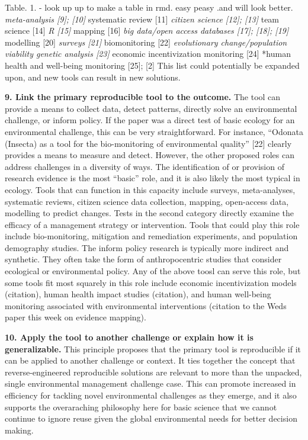 \documentclass[10pt,letterpaper]{article}
\begin{document}
Table. 1. - look up up to make a table in rmd. easy peasy .and will look
better. \emph{meta-analysis {[}9{]}; {[}10{]} }systematic review
{[}11{]} \emph{citizen science {[}12{]}; {[}13{]} }team science {[}14{]}
\emph{R {[}15{]} }mapping {[}16{]} \emph{big data/open access databases
{[}17{]}; {[}18{]}; {[}19{]} }modelling {[}20{]} \emph{surveys {[}21{]}
}biomonitoring {[}22{]} \emph{evolutionary change/population viability
genetic analysis {[}23{]} }economic incentivization monitoring {[}24{]}
*human health and well-being monitoring {[}25{]}; {[}2{]} This list
could potentially be expanded upon, and new tools can result in new
solutions.

\textbf{9. Link the primary reproducible tool to the outcome.} The tool
can provide a means to collect data, detect patterns, directly solve an
environmental challenge, or inform policy. If the paper was a direct
test of basic ecology for an environmental challenge, this can be very
straightforward. For instance, ``Odonata (Insecta) as a tool for the
bio-monitoring of environmental quality'' {[}22{]} clearly provides a
means to measure and detect. However, the other proposed roles can
address challenges in a diversity of ways. The identification of or
provision of research evidence is the most ``basic'' role, and it is
also likely the most typical in ecology. Tools that can function in this
capacity include surveys, meta-analyses, systematic reviews, citizen
science data collection, mapping, open-access data, modelling to predict
changes. Tests in the second category directly examine the efficacy of a
management strategy or intervention. Tools that could play this role
include bio-monitoring, mitigation and remediation experiments, and
population demography studies. The inform policy research is typically
more indirect and synthetic. They often take the form of anthropocentric
studies that consider ecological or environmental policy. Any of the
above toosl can serve this role, but some tools fit most squarely in
this role include economic incentivization models (citation), human
health impact studies (citation), and human well-being monitoring
associated with environmental interventions (citation to the Weds paper
this week on evidence mapping).

\textbf{10. Apply the tool to another challenge or explain how it is
generalizable.} This principle proposes that the primary tool is
reproducible if it can be applied to another challenge or context. It
ties together the concept that reverse-engineered reproducible solutions
are relevant to more than the unpacked, single environmental management
challenge case. This can promote increased in efficiency for tackling
novel environmental challenges as they emerge, and it also supports the
overaraching philosophy here for basic science that we cannot continue
to ignore reuse given the global environmental needs for better decision
making.
\end{document}
